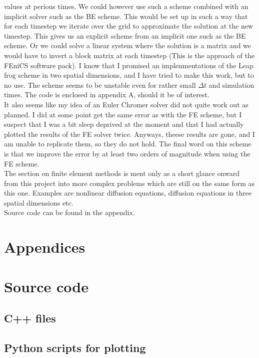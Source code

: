 \documentclass[a4paper,english, 10pt, twoside]{article}
\begin{document}
values at perious times. We could however use such a scheme combined with an implicit solver such as the BE scheme. This would be set up in such 
a way that for each timestep we iterate over the grid to approximate the solution at the new timestep. This gives us an explicit scheme from an 
implicit one such as the BE scheme. Or we could solve a linear system where the solution is a matrix and we would have to invert a  block matrix 
at each timestep (This is the approach of the FEniCS software pack). I know that I promised an implenmentations of the Leap frog scheme in two 
spatial dimensions, and I have tried to make this work, but to no use. The scheme seems to be unstable even for rather small $\Delta t$ and 
simulation times. The code is enclosed in appendix A, should it be of interest.\\
It also seems like my idea of an Euler Chromer solver did not quite work out as planned. I did at some point get the same error as with the FE 
scheme, but I suspect that I was a bit sleep deprived at the moment and that I had actually plotted the results of the FE solver twice. Anyways, 
theese results are gone, and I am unable to replicate them, so they do not hold. The final word on this scheme is that we improve the error by at 
least two orders of magnitude when using the FE scheme.\\
The section on finite element methods is ment only as a short glance onward from this project into more complex problems which are still on the same 
form as this one. Examples are nonlinear diffusion equations, diffusion equations in three spatial dimensions etc. \\
Source code can be found in the appendix.

\section{Appendices}
\appendix
\section{Source code}
\subsection{C++ files}

 
\subsection{Python scripts for plotting}


\end{document}
